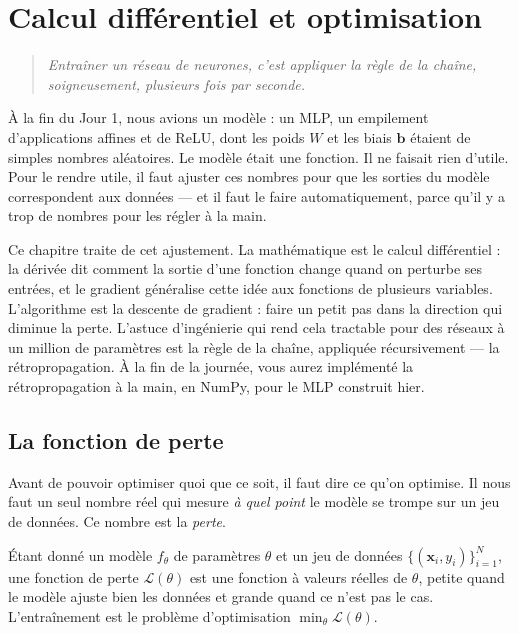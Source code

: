 \chapter{Calcul différentiel et optimisation}
\label{ch:jour2}

\begin{quote}
\emph{\og Entraîner un réseau de neurones, c'est appliquer la règle de la chaîne, soigneusement, plusieurs fois par seconde. \fg}
\end{quote}

À la fin du Jour 1, nous avions un modèle : un MLP, un empilement d'applications affines et de ReLU, dont les poids $W$ et les biais $\bm{b}$ étaient de simples nombres aléatoires. Le modèle était une fonction. Il ne faisait rien d'utile. Pour le rendre utile, il faut ajuster ces nombres pour que les sorties du modèle correspondent aux données --- et il faut le faire automatiquement, parce qu'il y a trop de nombres pour les régler à la main.

Ce chapitre traite de cet ajustement. La mathématique est le calcul différentiel : la dérivée dit comment la sortie d'une fonction change quand on perturbe ses entrées, et le gradient généralise cette idée aux fonctions de plusieurs variables. L'algorithme est la descente de gradient : faire un petit pas dans la direction qui diminue la perte. L'astuce d'ingénierie qui rend cela tractable pour des réseaux à un million de paramètres est la règle de la chaîne, appliquée récursivement --- la rétropropagation. À la fin de la journée, vous aurez implémenté la rétropropagation à la main, en NumPy, pour le MLP construit hier.

\section{La fonction de perte}

Avant de pouvoir optimiser quoi que ce soit, il faut dire ce qu'on optimise. Il nous faut un seul nombre réel qui mesure \emph{à quel point} le modèle se trompe sur un jeu de données. Ce nombre est la \emph{perte}.

\begin{definition}
Étant donné un modèle $f_\theta$ de paramètres $\theta$ et un jeu de données $\{(\bm{x}_i, y_i)\}_{i=1}^N$, une fonction de perte $\mathcal{L}(\theta)$ est une fonction à valeurs réelles de $\theta$, petite quand le modèle ajuste bien les données et grande quand ce n'est pas le cas. L'entraînement est le problème d'optimisation $\min_\theta \mathcal{L}(\theta)$.
\end{definition}

